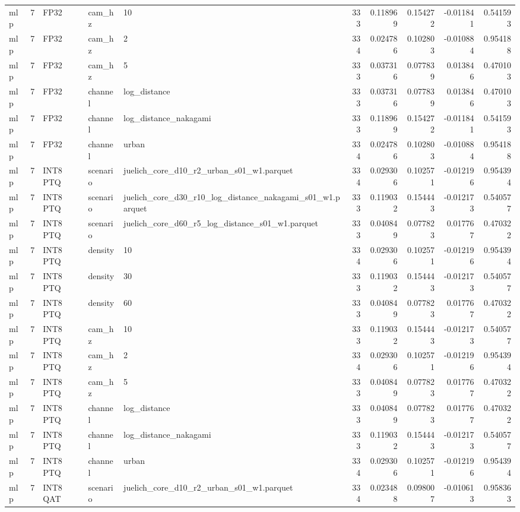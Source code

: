 \begin{tabular}{lrlllrrrrr}
mlp & 7 & FP32 & cam\_hz & 10 & 333 & 0.118969 & 0.154272 & -0.011841 & 0.541593 \\
mlp & 7 & FP32 & cam\_hz & 2 & 334 & 0.024786 & 0.102803 & -0.010884 & 0.954188 \\
mlp & 7 & FP32 & cam\_hz & 5 & 333 & 0.037316 & 0.077839 & 0.013846 & 0.470103 \\
mlp & 7 & FP32 & channel & log\_distance & 333 & 0.037316 & 0.077839 & 0.013846 & 0.470103 \\
mlp & 7 & FP32 & channel & log\_distance\_nakagami & 333 & 0.118969 & 0.154272 & -0.011841 & 0.541593 \\
mlp & 7 & FP32 & channel & urban & 334 & 0.024786 & 0.102803 & -0.010884 & 0.954188 \\
mlp & 7 & INT8 PTQ & scenario & juelich\_core\_d10\_r2\_urban\_s01\_w1.parquet & 334 & 0.029306 & 0.102571 & -0.012196 & 0.954394 \\
mlp & 7 & INT8 PTQ & scenario & juelich\_core\_d30\_r10\_log\_distance\_nakagami\_s01\_w1.parquet & 333 & 0.119032 & 0.154443 & -0.012173 & 0.540577 \\
mlp & 7 & INT8 PTQ & scenario & juelich\_core\_d60\_r5\_log\_distance\_s01\_w1.parquet & 333 & 0.040849 & 0.077823 & 0.017767 & 0.470322 \\
mlp & 7 & INT8 PTQ & density & 10 & 334 & 0.029306 & 0.102571 & -0.012196 & 0.954394 \\
mlp & 7 & INT8 PTQ & density & 30 & 333 & 0.119032 & 0.154443 & -0.012173 & 0.540577 \\
mlp & 7 & INT8 PTQ & density & 60 & 333 & 0.040849 & 0.077823 & 0.017767 & 0.470322 \\
mlp & 7 & INT8 PTQ & cam\_hz & 10 & 333 & 0.119032 & 0.154443 & -0.012173 & 0.540577 \\
mlp & 7 & INT8 PTQ & cam\_hz & 2 & 334 & 0.029306 & 0.102571 & -0.012196 & 0.954394 \\
mlp & 7 & INT8 PTQ & cam\_hz & 5 & 333 & 0.040849 & 0.077823 & 0.017767 & 0.470322 \\
mlp & 7 & INT8 PTQ & channel & log\_distance & 333 & 0.040849 & 0.077823 & 0.017767 & 0.470322 \\
mlp & 7 & INT8 PTQ & channel & log\_distance\_nakagami & 333 & 0.119032 & 0.154443 & -0.012173 & 0.540577 \\
mlp & 7 & INT8 PTQ & channel & urban & 334 & 0.029306 & 0.102571 & -0.012196 & 0.954394 \\
mlp & 7 & INT8 QAT & scenario & juelich\_core\_d10\_r2\_urban\_s01\_w1.parquet & 334 & 0.023488 & 0.098007 & -0.010613 & 0.958363 \\

\end{tabular}
